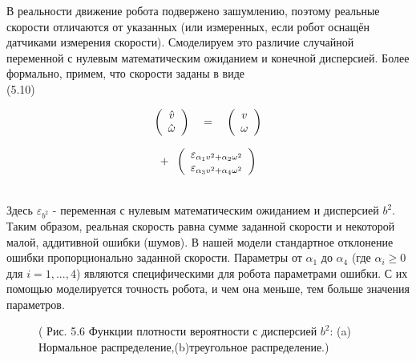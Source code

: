 \documentclass[10pt,a4paper]{article}
\begin{document}
В реальности движение робота подвержено зашумлению, поэтому реальные скорости отличаются от указанных (или измеренных, если робот оснащён датчиками измерения скорости). Смоделируем это различие случайной переменной с нулевым математическим ожиданием и конечной дисперсией. Более формально, примем, что скорости заданы в виде\\

(5.10) 
\begin{minipage}{0.3\textwidth}
	\begin{equation*}
	\left(\begin{array}{c}
	\hat{v}\\
	\hat{\omega}\\
	\end{array}\right)
	\hspace{4mm}
	\mbox {=} \hspace{4mm}\left(\begin{array}{c}
	v\\
	\omega\\
	\end{array}\right)
	\end{equation*}
\end{minipage}
\begin{minipage}{0.3\textwidth}
	\begin{equation*}
	\mbox {+} \hspace{2mm} 
	\left(\begin{array}{c}
	\varepsilon_{\alpha_1v^2+\alpha_2\omega^2}\\
	\varepsilon_{\alpha_3v^2+\alpha_4\omega^2}\\
	\end{array}\right)
	\end{equation*}
\end{minipage}\\

Здесь $\varepsilon_{b^2}$ - переменная с нулевым математическим ожиданием и дисперсией $b^2$. Таким образом, реальная скорость равна сумме заданной скорости и некоторой малой, аддитивной ошибки (шумов). 
В нашей модели стандартное отклонение ошибки пропорционально заданной скорости. Параметры от $\alpha_1$ до $\alpha_4$ (где $\alpha_i\geq0$ для $i = 1, . . . , 4$) являются специфическими для робота параметрами ошибки. С их помощью моделируется точность робота, и чем она меньше, тем больше значения параметров. 

\begin{figure}[H]
	\caption{ (  Рис. 5.6 Функции плотности вероятности с дисперсией $b^2$: (a) Нормальное распределение,(b)треугольное распределение.)}
	\label{fig:56orig}
\end{figure}
\end{document}
